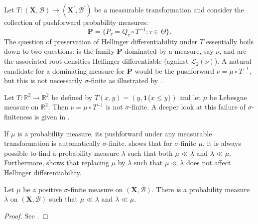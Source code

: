 Let \(T : (\mathbf{X}, \mathcal{B}) \to \left( \mathbf{X}^{\prime},
\mathcal{B}^{\prime} \right)\) be a measurable transformation and
consider the collection of pushforward probability measures:
\begin{equation*}
  \mathbf{P} = \{ P_{\tau} = Q_{\tau} \circ T^{- 1} : \tau \in \Theta\}.
\end{equation*}
The question of preservation of Hellinger differentiability under \(T\)
essentially boils down to two questions:
is the family \(\mathbf{P}\) dominated by a measure, say \(\nu\), and are the
associated root-densities Hellinger differentiable (against \(\mathscr{L}_{2}
(\nu)\)).
A natural candidate for a dominating measure for \(\mathbf{P}\) would be the
pushforward \(\nu = \mu \circ T^{- 1}\), but this is not necessarily
\(\sigma\)-finite as illustrated by .

\begin{example}
\label{eg--non-sigma-finite-pushforward}
Let \(T : \mathbb{R}^{2} \to \mathbb{R}^{2}\) be defined by \(T (x, y) = (y,
\mathbf{1} \{x \leq y\})\) and let \(\mu\) be Lebesgue measure on
\(\mathbb{R}^{2}\).
Then \(\nu = \mu \circ T^{- 1}\) is not \(\sigma\)-finite.
A deeper look at this failure of \(\sigma\)-finiteness is given in
.
\end{example}

If \(\mu\) is a probability measure, its pushforward under any measurable
transformation is automatically \(\sigma\)-finite.
 shows that for
\(\sigma\)-finite \(\mu\), it is always possible to find a probability
measure \(\lambda\) such that both \(\mu \ll \lambda\) and \(\lambda \ll \mu\).
Furthermore,  shows that
replacing \(\mu\) by \(\lambda\) such that \(\mu \ll \lambda\) does
not affect Hellinger differentiability.


\begin{theorem}
\label{thm--sigma-finite-meas-abs-bicont-prob-meas}
Let \(\mu\) be a positive \(\sigma\)-finite measure on \((\mathbf{X},
\mathcal{B})\).
There is a probability measure \(\lambda\) on \((\mathbf{X}, \mathcal{B})\) such
that \(\mu \ll \lambda\) and \(\lambda \ll \mu\).
\end{theorem}

\begin{proof}
See .
\end{proof}

